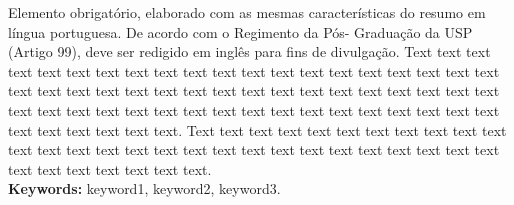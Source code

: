 \documentclass[12pt,twoside,a4paper]{book} %
\begin{document}
Elemento obrigatório, elaborado com as mesmas características do resumo em
língua portuguesa. De acordo com o Regimento da Pós- Graduação da USP (Artigo
99), deve ser redigido em inglês para fins de divulgação. 
Text text text text text text text text text text text text text text text text
text text text text text text text text text text text text text text text text
text text text text text text text text text text text text text text text text
text text text text text text text text text text text text.
Text text text text text text text text text text text text text text text text
text text text text text text text text text text text text text text text text
text text text.
\\

\noindent \textbf{Keywords:} keyword1, keyword2, keyword3.

\tableofcontents    %



\glsaddall
\printnoidxglossaries
\clearpage

\listoffigures            
\listoftables

\mainmatter

\fancyhead[RE,LO]{\thesection}

\doublespacing              %
\end{document}
